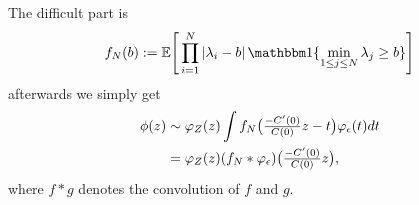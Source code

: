 The difficult part is
\[
	f_\dimension(b):=\E\Bigg[
		\prod_{i=1}^\dimension \left|
			\lambda_i - b
		\right|
		\ind\{\min_{1\le j\le\dimension}\lambda_j\ge b\}
	\Bigg]
\]
afterwards we simply get
\[\begin{aligned}
	\phi(z)
	&\sim \varphi_Z(z)
	\int f_N\bigl(\tfrac{-C'(0)}{C(0)}z - t\bigr)
	\varphi_\epsilon(t)dt\\
	&= \varphi_Z(z)
	(f_N * \varphi_\epsilon)\bigl(\tfrac{-C'(0)}{C(0)}z\bigr),
\end{aligned}\]
where \(f*g\) denotes the convolution of \(f\) and \(g\).




